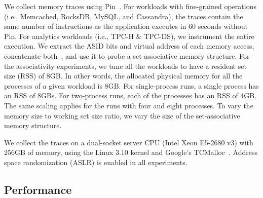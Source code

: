 We collect memory traces using Pin~\cite{luk:pin}. For workloads with fine-grained operations (i.e., Memcached, RocksDB, MySQL, and Cassandra), the traces contain the same number of instructions as the application executes in 60 seconds without Pin. For analytics workloads (i.e., TPC-H \& TPC-DS), we instrument the entire execution. We extract the ASID bits and virtual address of each memory access, concatenate both~\cite{basu:reducing, yoon:revisiting},  and use it to probe a set-associative memory structure. For the associativity experiments, we tune all the workloads to have a resident set size (RSS) of 8GB. In other words, the allocated physical memory for all the processes of a given workload is 8GB. For single-process runs, a single process has an RSS of 8GBs. For two-process runs, each of the processes has an RSS of 4GB. The same scaling applies for the runs with four and eight processes. To vary the memory size to working set size ratio, we vary the size of the set-associative memory structure. 


We collect the traces on a dual-socket server CPU (Intel Xeon E5-2680 v3) with $256$GB of memory, using the Linux 3.10 kernel and Google's TCMalloc~\cite{google:tcmalloc}. Address space randomization (ASLR) is enabled in all experiments.

\subsection{Performance}


